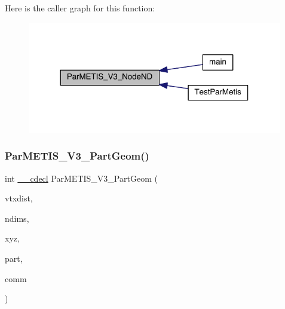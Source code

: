 Here is the caller graph for this function\+:\nopagebreak
\begin{figure}[H]
\begin{center}
\leavevmode
\includegraphics[width=316pt]{a00840_add23df29b4f232ac4c2cca94cc083a32_icgraph}
\end{center}
\end{figure}
\mbox{\label{a00840_aab31b6450a3228063206eddded9de65e}} 
\subsubsection{\texorpdfstring{Par\+M\+E\+T\+I\+S\+\_\+\+V3\+\_\+\+Part\+Geom()}{ParMETIS\_V3\_PartGeom()}}
{\footnotesize\ttfamily int \hyperlink{a00843_a238347d7669f8f1e9c83bfe63a2730c4}{\+\_\+\+\_\+cdecl} Par\+M\+E\+T\+I\+S\+\_\+\+V3\+\_\+\+Part\+Geom (\begin{DoxyParamCaption}\item[{\hyperlink{a00876_aaa5262be3e700770163401acb0150f52}{idx\+\_\+t} $\ast$}]{vtxdist,  }\item[{\hyperlink{a00876_aaa5262be3e700770163401acb0150f52}{idx\+\_\+t} $\ast$}]{ndims,  }\item[{\hyperlink{a00876_a1924a4f6907cc3833213aba1f07fcbe9}{real\+\_\+t} $\ast$}]{xyz,  }\item[{\hyperlink{a00876_aaa5262be3e700770163401acb0150f52}{idx\+\_\+t} $\ast$}]{part,  }\item[{M\+P\+I\+\_\+\+Comm $\ast$}]{comm }\end{DoxyParamCaption})}

